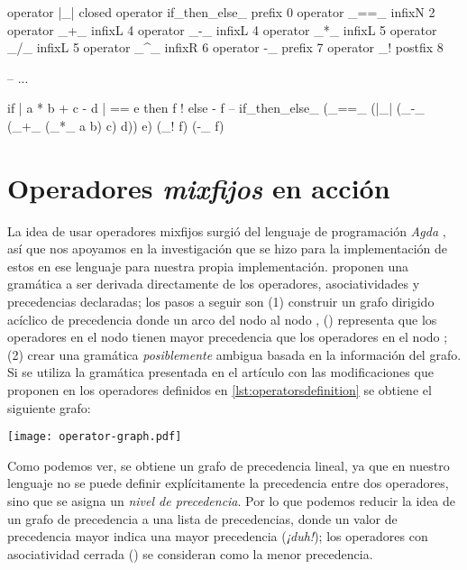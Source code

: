 {\begin{designfr}
\begin{anglercode}[label=lst:operatorsdefinition]
operator |_|                closed
operator if_then_else_      prefix  0
operator _==_               infixN  2
operator _+_                infixL  4
operator _-_                infixL  4
operator _*_                infixL  5
operator _/_                infixL  5
operator _^_                infixR  6
operator -_                 prefix  7
operator _!                 postfix 8

-- ...

if | a * b + c - d | == e then f ! else - f
-- if_then_else_ (_==_ (|_| (_-_ (_+_ (_*_ a b) c) d)) e) (_! f) (-_ f)
\end{anglercode}
\end{designfr}

\section{Operadores \emph{mixfijos} en acción}

\begin{investigationfr}
La idea de usar operadores mixfijos surgió del lenguaje de programación \emph{Agda} \cite{agda}, así que nos apoyamos en la investigación que se hizo para la implementación de estos en ese lenguaje para nuestra propia implementación. \textcite{parsing-mixfix-operators} proponen una gramática a ser derivada directamente de los operadores, asociatividades y precedencias declaradas; los pasos a seguir son (1) construir un grafo dirigido acíclico de precedencia donde un arco del nodo  al nodo , () representa que los operadores en el nodo  tienen mayor precedencia que los operadores en el nodo ; (2) crear una gramática \emph{posiblemente} ambigua basada en la información del grafo. Si se utiliza la gramática presentada en el artículo con las modificaciones que proponen en los operadores definidos en \ref{lst:operatorsdefinition} se obtiene el siguiente grafo:

\begin{center}
\texttt{[image: operator-graph.pdf]}
\label{fig:operator-graph}
\end{center}

Como podemos ver, se obtiene un grafo de precedencia lineal, ya que en nuestro lenguaje no se puede definir explícitamente la precedencia entre dos operadores, sino que se asigna un \emph{nivel de precedencia}. Por lo que podemos reducir la idea de un grafo de precedencia a una lista de precedencias, donde un valor de precedencia mayor indica una mayor precedencia (\emph{¡duh!}); los operadores con asociatividad cerrada () se consideran como la menor precedencia.


\end{investigationfr}}
